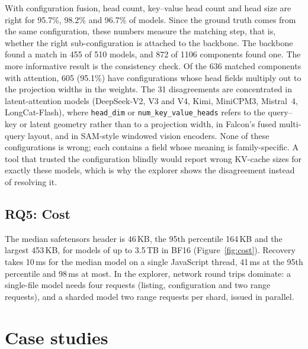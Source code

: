 \documentclass[11pt]{article}
\newcommand{\tn}[1]{\texttt{#1}}
\begin{document}
With configuration fusion, head count, key--value head count and head size are right for 95.7\%, 98.2\% and 96.7\% of models. Since the ground truth comes from the same configuration, these numbers measure the matching step, that is, whether the right sub-configuration is attached to the backbone. The backbone found a match in 455 of 510 models, and 872 of 1106 components found one. The more informative result is the consistency check. Of the 636 matched components with attention, 605 (95.1\%) have configurations whose head fields multiply out to the projection widths in the weights. The 31 disagreements are concentrated in latent-attention models (DeepSeek-V2, V3 and V4, Kimi, MiniCPM3, Mistral~4, LongCat-Flash), where \tn{head\_dim} or \tn{num\_key\_value\_heads} refers to the query--key or latent geometry rather than to a projection width, in Falcon's fused multi-query layout, and in SAM-style windowed vision encoders. None of these configurations is wrong; each contains a field whose meaning is family-specific. A tool that trusted the configuration blindly would report wrong KV-cache sizes for exactly these models, which is why the explorer shows the disagreement instead of resolving it.

\subsection{RQ5: Cost}
The median safetensors header is 46\,KB, the 95th percentile 164\,KB and the largest 453\,KB, for models of up to 3.5\,TB in BF16 (Figure~\ref{fig:cost}). Recovery takes 10\,ms for the median model on a single JavaScript thread, 41\,ms at the 95th percentile and 98\,ms at most. In the explorer, network round trips dominate: a single-file model needs four requests (listing, configuration and two range requests), and a sharded model two range requests per shard, issued in parallel.

\RBsection

\section{Case studies}
\label{sec:cases}
\end{document}
